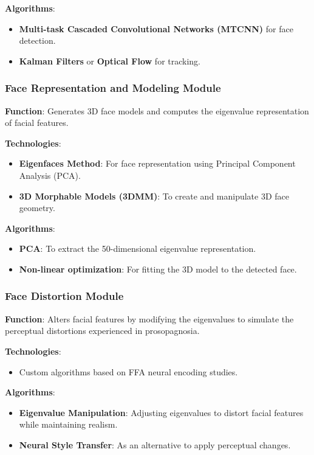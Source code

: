 \documentclass{article}
\begin{document}
\textbf{Algorithms}:
\begin{itemize}
    \item \textbf{Multi-task Cascaded Convolutional Networks (MTCNN)} for face detection.
    \item \textbf{Kalman Filters} or \textbf{Optical Flow} for tracking.
\end{itemize}

\subsubsection{Face Representation and Modeling Module}

\textbf{Function}: Generates 3D face models and computes the eigenvalue representation of facial features. \cite{chang_2017}

\textbf{Technologies}:
\begin{itemize}
    \item \textbf{Eigenfaces Method}: For face representation using Principal Component Analysis (PCA).
    \item \textbf{3D Morphable Models (3DMM)}: To create and manipulate 3D face geometry.
\end{itemize}

\textbf{Algorithms}:
\begin{itemize}
    \item \textbf{PCA}: To extract the 50-dimensional eigenvalue representation.
    \item \textbf{Non-linear optimization}: For fitting the 3D model to the detected face.
\end{itemize}

\subsubsection{Face Distortion Module}

\textbf{Function}: Alters facial features by modifying the eigenvalues to simulate the perceptual distortions experienced in prosopagnosia.

\textbf{Technologies}:
\begin{itemize}
    \item Custom algorithms based on FFA neural encoding studies.
\end{itemize}

\textbf{Algorithms}:
\begin{itemize}
    \item \textbf{Eigenvalue Manipulation}: Adjusting eigenvalues to distort facial features while maintaining realism.
    \item \textbf{Neural Style Transfer}: As an alternative to apply perceptual changes.
\end{itemize}
\end{document}
